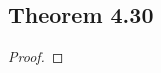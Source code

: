 \documentclass[../../main.tex]{subfiles}
\begin{document}
\subsection{Theorem 4.30}
\begin{wts}

\end{wts}
\begin{proof}

\end{proof}
\end{document}
